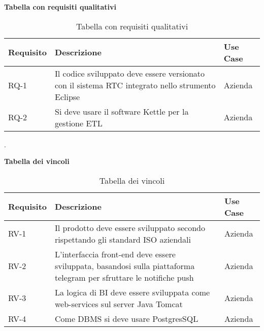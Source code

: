 \begin{table}
\begin{center}
\textbf{Tabella con requisiti qualitativi}
\end{center}
\begin{tabular}{ |p{2cm}|p{8cm}|p{2cm}| }
 \hline
\textbf{ Requisito}   &  \textbf{Descrizione}    &  \textbf{    Use Case} \\ 
\hline
RQ-1  &  Il codice sviluppato deve essere versionato con il sistema RTC integrato nello strumento Eclipse & Azienda \\
\hline
RQ-2 &  Si deve usare il software Kettle per la gestione ETL & Azienda \\
\hline
\end{tabular}
\caption{Tabella con requisiti qualitativi}
\end{table}
.
\begin{table}
\begin{center}
\textbf{Tabella dei vincoli}
\end{center}
\begin{tabular}{ |p{2cm}|p{8cm}|p{2cm}| }
 \hline
\textbf{ Requisito}   &  \textbf{Descrizione}    &  \textbf{    Use Case} \\ 
\hline
RV-1 &  Il prodotto deve essere sviluppato secondo rispettando  gli standard ISO aziendali & Azienda \\
\hline
RV-2 &  L'interfaccia front-end deve essere sviluppata, basandosi sulla piattaforma telegram per sfruttare le notifiche push  & Azienda \\
\hline
RV-3 &  La logica di BI deve essere sviluppata come web-services sul server Java Tomcat& Azienda \\
\hline
RV-4 & Come DBMS si deve usare PostgresSQL & Azienda \\
\hline
\end{tabular}

\caption{Tabella dei vincoli}
\end{table}





